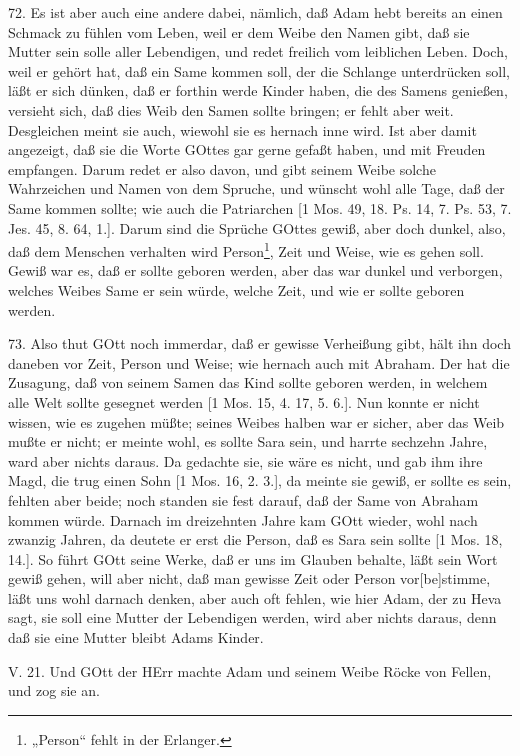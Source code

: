 72. Es ist aber auch eine andere dabei, nämlich, daß Adam hebt bereits an einen Schmack zu fühlen vom Leben, weil er dem Weibe den Namen gibt, daß sie Mutter sein solle aller Lebendigen, und redet freilich vom leiblichen Leben. Doch, weil er gehört hat, daß ein Same kommen soll, der die Schlange unterdrücken soll, läßt er sich dünken, daß er forthin werde Kinder haben, die des Samens genießen, versieht sich, daß dies Weib den Samen sollte bringen; er fehlt aber weit. Desgleichen meint sie auch, wiewohl sie es hernach inne wird. Ist aber damit angezeigt, daß sie die Worte GOttes gar gerne gefaßt haben, und mit Freuden empfangen. Darum redet er also davon, und gibt seinem Weibe solche Wahrzeichen und Namen von dem Spruche, und wünscht wohl alle Tage, daß der Same kommen sollte; wie auch die Patriarchen [1 Mos. 49, 18. Ps. 14, 7. Ps. 53, 7. Jes. 45, 8. 64, 1.]. Darum sind die Sprüche GOttes gewiß, aber doch dunkel, also, daß dem Menschen verhalten wird Person\footnote{„Person“ fehlt in der Erlanger.}, Zeit und Weise, wie es gehen soll. Gewiß war es, daß er sollte geboren werden, aber das war dunkel und verborgen, welches Weibes Same er sein würde, welche Zeit, und wie er sollte geboren werden.

73. Also thut GOtt noch immerdar, daß er gewisse Verheißung gibt, hält ihn doch daneben vor Zeit, Person und Weise; wie hernach auch mit Abraham. Der hat die Zusagung, daß von seinem Samen das Kind sollte geboren werden, in welchem alle Welt sollte gesegnet werden [1 Mos. 15, 4. 17, 5. 6.]. Nun konnte er nicht wissen, wie es zugehen müßte; seines Weibes halben war er sicher, aber das Weib mußte er nicht; er meinte wohl, es sollte Sara sein, und harrte sechzehn Jahre, ward aber nichts daraus. Da gedachte sie, sie wäre es nicht, und gab ihm ihre Magd, die trug einen Sohn [1 Mos. 16, 2. 3.], da meinte sie gewiß, er sollte es sein, fehlten aber beide; noch standen sie fest darauf, daß der Same von Abraham kommen würde. Darnach im dreizehnten Jahre kam GOtt wieder, wohl nach zwanzig Jahren, da deutete er erst die Person, daß es Sara sein sollte [1 Mos. 18, 14.]. So führt GOtt seine Werke, daß er uns im Glauben behalte, läßt sein Wort gewiß gehen, will aber nicht, daß man gewisse Zeit oder Person vor[be]stimme, läßt uns wohl darnach denken, aber auch oft fehlen, wie hier Adam, der zu Heva sagt, sie soll eine Mutter der Lebendigen werden, wird aber nichts daraus, denn daß sie eine Mutter bleibt Adams Kinder.

\begin{schriftzitat}
V. 21. Und GOtt der HErr machte Adam und seinem Weibe Röcke von Fellen, und zog sie an.
\end{schriftzitat}

